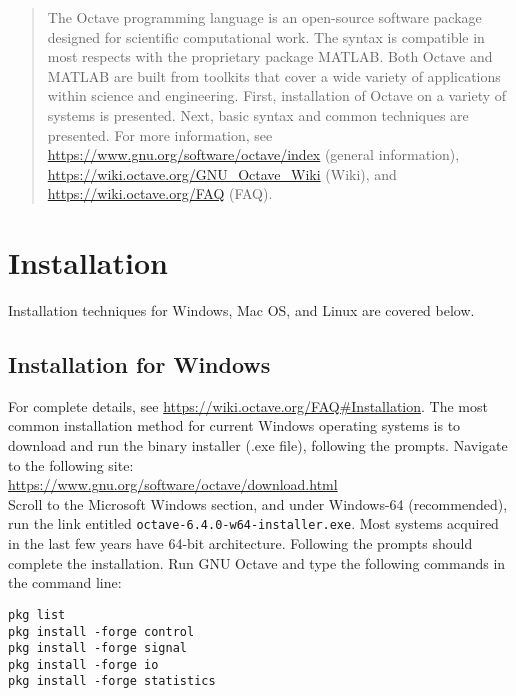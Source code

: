 \documentclass[10pt]{article}
\begin{document}
\maketitle

\begin{abstract}
The Octave programming language is an open-source software package designed for scientific computational work.  The syntax is compatible in most respects with the proprietary package MATLAB.  Both Octave and MATLAB are built from toolkits that cover a wide variety of applications within science and engineering.  First, installation of Octave on a variety of systems is presented.  Next, basic syntax and common techniques are presented.  For more information, see \url{https://www.gnu.org/software/octave/index} (general information), \url{https://wiki.octave.org/GNU_Octave_Wiki} (Wiki), and \url{https://wiki.octave.org/FAQ} (FAQ).
\end{abstract}

\section{Installation}

Installation techniques for Windows, Mac OS, and Linux are covered below.

\subsection{Installation for Windows}

For complete details, see \url{https://wiki.octave.org/FAQ#Installation}.  The most common installation method for current Windows operating systems is to download and run the binary installer (.exe file), following the prompts.  Navigate to the following site: \\

\url{https://www.gnu.org/software/octave/download.html} \\

Scroll to the Microsoft Windows section, and under Windows-64 (recommended), run the link entitled \verb+octave-6.4.0-w64-installer.exe+.  Most systems acquired in the last few years have 64-bit architecture.  Following the prompts should complete the installation.  Run GNU Octave and type the following commands in the command line:

\begin{verbatim}
pkg list
pkg install -forge control
pkg install -forge signal
pkg install -forge io
pkg install -forge statistics
\end{verbatim}
\end{document}
